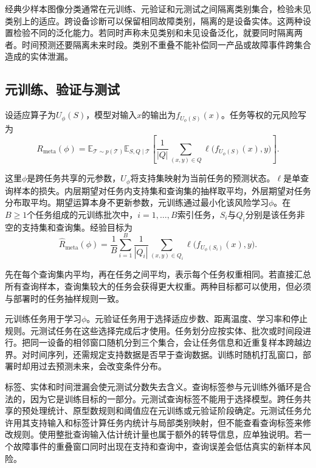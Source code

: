 经典少样本图像分类通常在元训练、元验证和元测试之间隔离类别集合，检验未见类别上的适应。跨设备诊断可以保留相同故障类别，隔离的是设备实体。这两种设置检验不同的泛化能力。若同时声称未见类别和未见设备泛化，就要同时隔离两者。时间预测还要隔离未来时段。类别不重叠不能补偿同一产品或故障事件跨集合造成的实体泄漏。

\subsection{元训练、验证与测试}

设适应算子为$U_\phi(S)$，模型对输入$x$的输出为$f_{U_\phi(S)}(x)$。任务等权的元风险写为
\begin{equation}
R_{\mathrm{meta}}(\phi)=
\mathbb E_{\mathcal T\sim p(\mathcal T)}
\mathbb E_{S,Q\mid\mathcal T}
\left[\frac{1}{|Q|}\sum_{(x,y)\in Q}
\ell\bigl(f_{U_\phi(S)}(x),y\bigr)\right].
\label{eq:meta-risk}
\end{equation}

这里$\phi$是跨任务共享的元参数，$U_\phi$将支持集映射为当前任务的预测状态。$\ell$是单查询样本的损失。内层期望对任务内支持集和查询集的抽样取平均，外层期望对任务分布取平均。期望运算本身不更新参数，元训练通过最小化该风险学习$\phi$。在$B\geq1$个任务组成的元训练批次中，$i=1,\ldots,B$索引任务，$S_i$与$Q_i$分别是该任务非空的支持集和查询集。经验目标为
\begin{equation}
\widehat R_{\mathrm{meta}}(\phi)=\frac1B\sum_{i=1}^{B}\frac1{|Q_i|}
\sum_{(x,y)\in Q_i}\ell\bigl(f_{U_\phi(S_i)}(x),y\bigr).
\end{equation}

先在每个查询集内平均，再在任务之间平均，表示每个任务权重相同。若直接汇总所有查询样本，查询集较大的任务会获得更大权重。两种目标都可以使用，但必须与部署时的任务抽样规则一致。

元训练任务用于学习$\phi$。元验证任务用于选择适应步数、距离温度、学习率和停止规则。元测试任务在这些选择完成后才使用。任务划分应按实体、批次或时间段进行。把同一设备的相邻窗口随机分到三个集合，会让任务信息和近重复样本跨越边界。对时间序列，还需规定支持数据是否早于查询数据。训练时随机打乱窗口，部署时却用过去预测未来，会改变条件分布。

标签、实体和时间泄漏会使元测试分数失去含义。查询标签参与元训练外循环是合法的，因为它是训练目标的一部分。元测试查询标签不能用于选择模型。跨任务共享的预处理统计、原型数规则和阈值应在元训练或元验证阶段确定。元测试任务允许用其支持输入和标签计算任务内统计与局部类别映射，但不能查看查询标签来修改规则。使用整批查询输入估计统计量也属于额外的转导信息，应单独说明。若一个故障事件的重叠窗口同时出现在支持和查询中，查询误差会低估真实的新样本风险。

